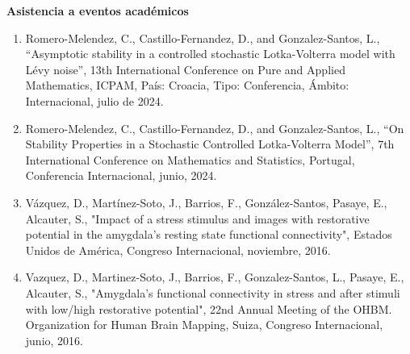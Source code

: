 {\large \textbf{\color{red}\textbf{Asistencia a eventos académicos}}}

\begin{enumerate}
\item Romero-Melendez, C., Castillo-Fernandez, D., and Gonzalez-Santos, L., “Asymptotic stability in a controlled stochastic Lotka-Volterra model with 
Lévy noise”, 13th International Conference on Pure and Applied Mathematics, ICPAM, País: Croacia, Tipo: Conferencia, Ámbito: Internacional, julio de 
2024.

\item Romero-Melendez, C., Castillo-Fernandez, D., and Gonzalez-Santos, L., “On Stability Properties in a Stochastic Controlled Lotka-Volterra Model”, 
7th 
International Conference on Mathematics and Statistics, Portugal, Conferencia Internacional, junio, 2024.

\item Vázquez, D., Martínez-Soto, J., Barrios, F., González-Santos, Pasaye, E., Alcauter, S., "Impact of a stress stimulus and images with restorative 
potential in the amygdala's resting state functional connectivity", Estados Unidos de América, Congreso Internacional, noviembre, 2016.

\item Vazquez, D., Martinez-Soto, J., Barrios, F., Gonzalez-Santos, L., Pasaye, E., Alcauter, S., "Amygdala's functional connectivity in stress and 
after 
stimuli with low/high restorative potential", 22nd Annual Meeting of the OHBM. Organization for Human Brain Mapping, Suiza, Congreso Internacional, 
junio, 2016.
\end{enumerate}

